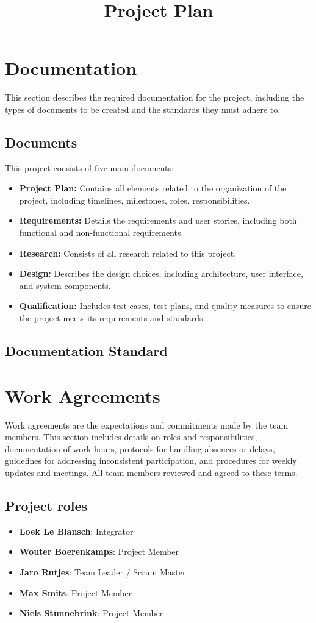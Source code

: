 \documentclass{projdoc}
\title{Project Plan}
\begin{document}
\tablestables
\newpage

\section{Documentation}
This section describes the required documentation for the project, including the types of documents to be created and the standards they must adhere to.
\subsection{Documents}
This project consists of five main documents:
\begin{itemize}
    \item \textbf{Project Plan:} Contains all elements related to the 
    organization of the project, including timelines, milestones, roles, 
    responsibilities.
    \item \textbf{Requirements:} Details the requirements and 
    user stories, including both functional and non-functional requirements.
    \item \textbf{Research:} Consists of all research related to this project.
    \item \textbf{Design:} Describes the design choices, including 
    architecture, user interface, and system components.
    \item \textbf{Qualification:} Includes test cases, test plans, and quality measures to 
    ensure the project meets its requirements and standards.
\end{itemize}

\subsection{Documentation Standard}

\newpage

\section{Work Agreements}
Work agreements are the expectations and commitments made by the team members. 
This section includes details on roles and responsibilities, documentation of 
work hours, protocols for handling absences or delays, guidelines for 
addressing inconsistent participation, and procedures for weekly updates and 
meetings. All team members reviewed and agreed to these terms.

\subsection{Project roles}
\begin{itemize}
    \item \textbf{Loek Le Blansch}: Integrator
    \item \textbf{Wouter Boerenkamps}: Project Member
    \item \textbf{Jaro Rutjes}: Team Leader / Scrum Master
    \item \textbf{Max Smits}: Project Member
    \item \textbf{Niels Stunnebrink}: Project Member
\end{itemize}
\end{document}
